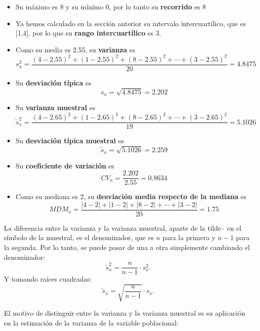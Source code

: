 \documentclass[
  spanish,
  letterpaper,
  DIV=11,
  numbers=noendperiod]{scrreprt}
\begin{document}
\begin{itemize}
\item
  Su máximo es 8 y su mínimo 0, por lo tanto su \textbf{recorrido} es 8
\item
  Ya hemos calculado en la sección anterior su intervalo
  intercuartílico, que es {[}1,4{]}, por lo que su \textbf{rango
  intercuartílico} es 3.
\item
  Como su media es 2.55, su \textbf{varianza} es \[
  s^2_x=\frac{(4-2.55)^2+(1-2.55)^2+(8-2.55)^2+\cdots+(3-2.55)^2}{20}=4.8475
  \]
\item
  Su \textbf{desviación típica} es \[
  s_x=\sqrt{4.8475}=2.202
  \]
\item
  Su \textbf{varianza muestral} es \[
  \widetilde{s}^2_x=\frac{(4-2.65)^2+(1-2.65)^2+(8-2.65)^2+\cdots+(3-2.65)^2}{19}=5.1026
  \]
\item
  Su \textbf{desviación típica muestral} es \[
  \widetilde{s}_x=\sqrt{5.1026}=2.259
  \]
\item
  Su \textbf{coeficiente de variación} es \[
  CV_x=\frac{2.202}{2.55}=0.8634
  \]
\item
  Como su mediana es 2, su \textbf{desviación media respecto de la
  mediana} es \[
  MDM_x=\frac{|4-2|+|1-2|+|8-2|+\cdots+|3-2|}{20}=1.75
  \]
\end{itemize}

\begin{tcolorbox}[enhanced jigsaw, arc=.35mm, bottomrule=.15mm, bottomtitle=1mm, breakable, colback=white, colbacktitle=quarto-callout-note-color!10!white, colframe=quarto-callout-note-color-frame, coltitle=black, left=2mm, leftrule=.75mm, opacityback=0, opacitybacktitle=0.6, rightrule=.15mm, title=\textcolor{quarto-callout-note-color}{\faInfo}\hspace{0.5em}{Nota}, titlerule=0mm, toprule=.15mm, toptitle=1mm]

La diferencia entre la varianza y la varianza muestral, aparte de la
tilde \(\widetilde{\ }\) en el símbolo de la muestral, es el
denominador, que es \(n\) para la primera y \(n-1\) para la segunda. Por
lo tanto, se puede pasar de una a otra simplemente cambiando el
denominador: \[
\widetilde{s}^2_x=\frac{n}{n-1}\cdot s^2_x.
\] Y tomando raíces cuadradas: \[
\widetilde{s}_x=\sqrt{\frac{n}{n-1}}\cdot s_x.
\]

\end{tcolorbox}

El motivo de distinguir entre la varianza y la varianza muestral es su
aplicación en la estimación de la varianza de la variable poblacional:
\end{document}
